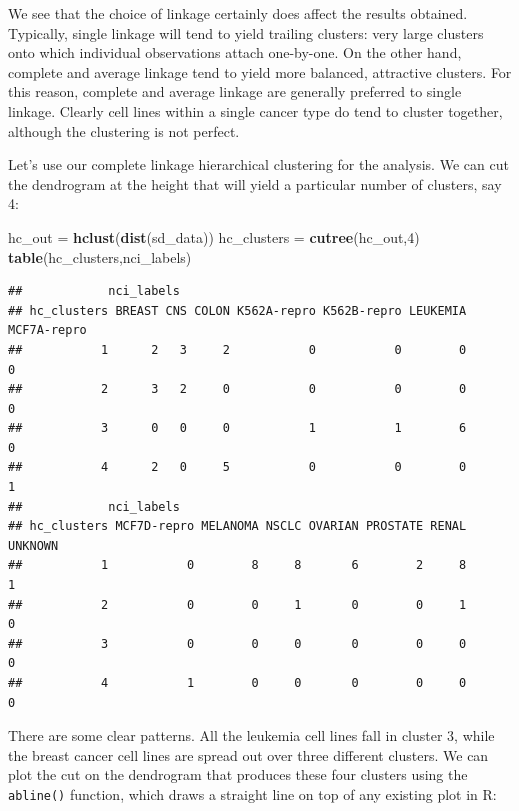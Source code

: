 \documentclass[openany]{book}
\newenvironment{Shaded}{\begin{snugshade}}{\end{snugshade}}
\newcommand{\DecValTok}[1]{\textcolor[rgb]{0.00,0.00,0.81}{#1}}
\newcommand{\KeywordTok}[1]{\textcolor[rgb]{0.13,0.29,0.53}{\textbf{#1}}}
\newcommand{\NormalTok}[1]{#1}
\newcommand{\StringTok}[1]{\textcolor[rgb]{0.31,0.60,0.02}{#1}}
\begin{document}
We see that the choice of linkage
certainly does affect the results obtained. Typically, single linkage will tend
to yield trailing clusters: very large clusters onto which individual observations
attach one-by-one. On the other hand, complete and average linkage
tend to yield more balanced, attractive clusters. For this reason, complete
and average linkage are generally preferred to single linkage. Clearly cell
lines within a single cancer type do tend to cluster together, although the
clustering is not perfect.

Let's use our complete linkage hierarchical clustering
for the analysis. We can cut the dendrogram at the height that will yield a particular
number of clusters, say 4:

\begin{Shaded}
\begin{Highlighting}[]
\NormalTok{hc_out =}\StringTok{ }\KeywordTok{hclust}\NormalTok{(}\KeywordTok{dist}\NormalTok{(sd_data))}
\NormalTok{hc_clusters =}\StringTok{ }\KeywordTok{cutree}\NormalTok{(hc_out,}\DecValTok{4}\NormalTok{)}
\KeywordTok{table}\NormalTok{(hc_clusters,nci_labels)}
\end{Highlighting}
\end{Shaded}

\begin{verbatim}
##            nci_labels
## hc_clusters BREAST CNS COLON K562A-repro K562B-repro LEUKEMIA MCF7A-repro
##           1      2   3     2           0           0        0           0
##           2      3   2     0           0           0        0           0
##           3      0   0     0           1           1        6           0
##           4      2   0     5           0           0        0           1
##            nci_labels
## hc_clusters MCF7D-repro MELANOMA NSCLC OVARIAN PROSTATE RENAL UNKNOWN
##           1           0        8     8       6        2     8       1
##           2           0        0     1       0        0     1       0
##           3           0        0     0       0        0     0       0
##           4           1        0     0       0        0     0       0
\end{verbatim}

There are some clear patterns. All the leukemia cell lines fall in cluster 3,
while the breast cancer cell lines are spread out over three different clusters.
We can plot the cut on the dendrogram that produces these four clusters using the \texttt{abline()} function, which draws a straight line on top of any existing plot in R:
\end{document}
